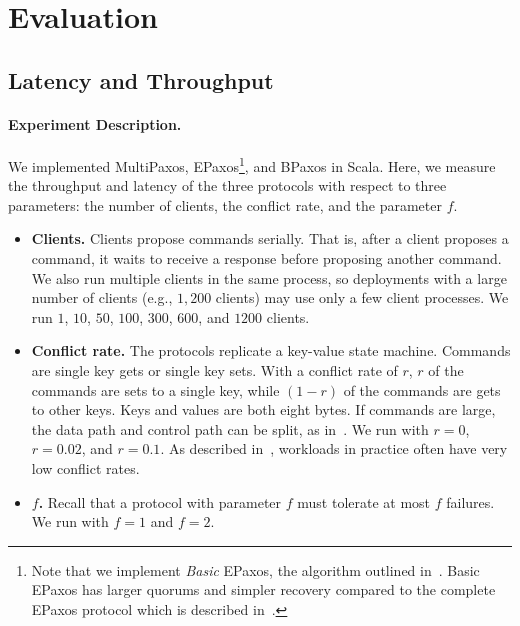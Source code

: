\section{Evaluation}

\subsection{Latency and Throughput}
{}

\paragraph{Experiment Description.}
We implemented MultiPaxos, EPaxos\footnote{Note that we implement \emph{Basic}
EPaxos, the algorithm outlined in~\cite{moraru2013proof}. Basic EPaxos has
larger quorums and simpler recovery compared to the complete EPaxos protocol
which is described in~\cite{moraru2013there}.}, and BPaxos in Scala. Here, we
measure the throughput and latency of the three protocols with respect to three
parameters: the number of clients, the conflict rate, and the parameter $f$.

\begin{itemize}
  \item \textbf{Clients.}
    Clients propose commands serially. That is, after a client proposes a
    command, it waits to receive a response before proposing another command.
    We also run multiple clients in the same process, so deployments with a
    large number of clients (e.g., $1,200$ clients) may use only a few client
    processes. We run $1$, $10$, $50$, $100$, $300$, $600$, and $1200$ clients.

  \item \textbf{Conflict rate.}
    The protocols replicate a key-value state machine. Commands are single key gets
    or single key sets. With a conflict rate of $r$, $r$ of the commands are sets
    to a single key, while $(1 - r)$ of the commands are gets to other keys. Keys
    and values are both eight bytes. If commands are large, the data path and
    control path can be split, as in~\cite{biely2012s}. We run with $r=0$,
    $r=0.02$, and $r=0.1$. As described in~\cite{moraru2013there}, workloads in
    practice often have very low conflict rates.

  \item \textbf{$f$.}
    Recall that a protocol with parameter $f$ must tolerate at most $f$ failures.
    We run with $f=1$ and $f=2$.
\end{itemize}

